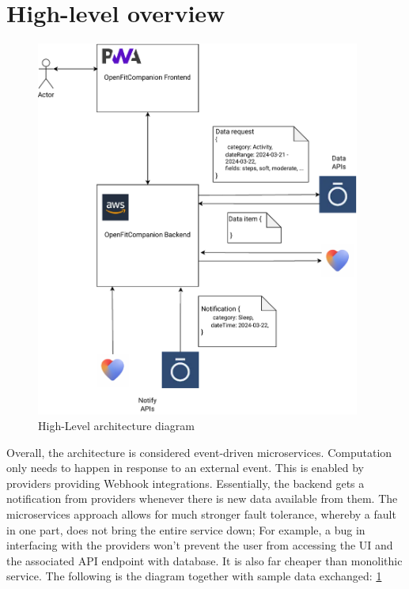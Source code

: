 \section{High-level overview}
\begin{figure}
    
    \centering
    \includegraphics[width=0.95\textwidth,keepaspectratio]{../images/highLevel.pdf}
    \caption{High-Level architecture diagram}
    \label{fig:1}
    
\end{figure}
Overall, the architecture is considered event-driven microservices. Computation only needs to happen in response to an external event. This is enabled by providers providing Webhook integrations. Essentially, the backend gets a notification from providers whenever there is new data available from them. The microservices approach allows for much stronger fault tolerance, whereby a fault in one part, does not bring the entire service down; For example, a bug in interfacing with the providers won't prevent the user from accessing the UI and the associated API endpoint with database. It is also far cheaper than monolithic service. The following is the diagram together with sample data exchanged: \ref{fig:1}

